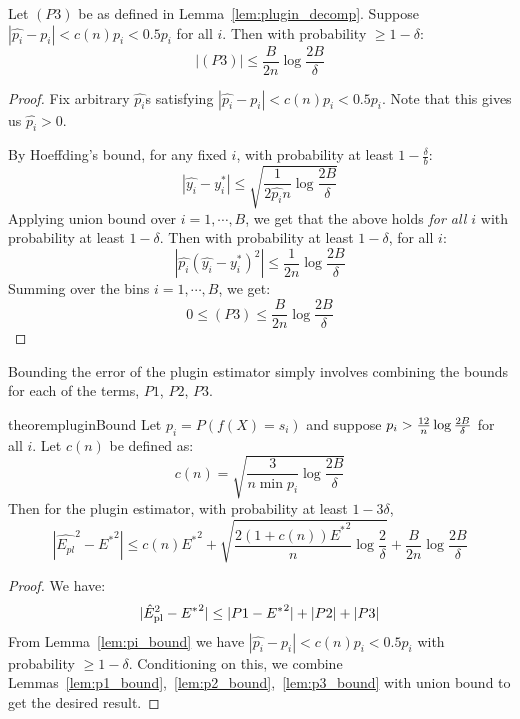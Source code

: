 \begin{lemma}
\label{lem:p3_bound}
Let $(P3)$ be as defined in Lemma~\ref{lem:plugin_decomp}.
Suppose $|\hat{p_i} - p_i| < c(n)p_i < 0.5p_i$ for all $i$. Then with probability $\geq 1 - \delta$:
\[ |(P3)| \leq \frac{B}{2n} \log{\frac{2B}{\delta}} \]
\end{lemma}

\begin{proof}
Fix arbitrary $\hat{p_i}$s satisfying $|\hat{p_i} - p_i| < c(n) p_i < 0.5p_i$. Note that this gives us $\hat{p_i} > 0$.

By Hoeffding's bound, for any fixed $i$, with probability at least $1-\frac{\delta}{b}$:
\[ |\hat{y_i} - y_i^*| \leq \sqrt{\frac{1}{2\hat{p_i}n} \log{\frac{2B}{\delta}}} \]
Applying union bound over $i = 1, \cdots, B$, we get that the above holds \emph{for all $i$} with probability at least $1 - \delta$. Then with probability at least $1 - \delta$, for all $i$:
\[ | \hat{p_i} (\hat{y_i} - y_i^*)^2 | \leq \frac{1}{2n} \log{\frac{2B}{\delta}} \]
Summing over the bins $i = 1, \cdots, B$, we get:
\[ 0 \leq (P3) \leq \frac{B}{2n} \log{\frac{2B}{\delta}}  \]
\end{proof}


Bounding the error of the plugin estimator simply involves combining the bounds for each of the terms, $P1$, $P2$, $P3$.

\begin{restatable}{theorem}{pluginBound}
\label{thm:plugin-bound}
Let $p_i = P(f(X) = s_i)$ and suppose $p_i > \frac{12}{n}\log{\frac{2B}{\delta}}{}$ for all $i$. Let $c(n)$ be defined as:
\[ c(n) = \sqrt{\frac{3}{n \min p_i} \log{\frac{2B}{\delta}}} \]
Then for the plugin estimator, with probability at least $1 - 3\delta$,
\[ | \hat{E_{pl}}^2 - {E^*}^2 | \leq c(n){E^*}^2 + \sqrt{\frac{2(1+c(n)){E^*}^2}{n} \log{\frac{2}{\delta}}} + \frac{B}{2n} \log{\frac{2B}{\delta}} \]
\end{restatable}

\begin{proof}
We have:
\[ |\hat{E}_{\textup{pl}}^2{} - {E^*}^2| \leq |P1 - {E^*}^2| + |P2| + |P3| \]
From Lemma~\ref{lem:pi_bound} we have $|\hat{p_i} - p_i| < c(n)p_i < 0.5p_i$ with probability $\geq 1 - \delta$. Conditioning on this, we combine Lemmas~\ref{lem:p1_bound},~\ref{lem:p2_bound},~\ref{lem:p3_bound} with union bound to get the desired result.
\end{proof}

